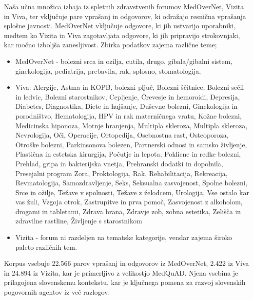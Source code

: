 \documentclass[fleqn,moreauthors,10pt]{ds_report}
\begin{document}
Naša učna množica izhaja iz spletnih zdravstvenih forumov MedOverNet, Vizita in Viva, ter vključuje pare vprašanj in odgovorov, ki odražajo resnična vprašanja splošne javnosti. MedOverNet vključuje odgovore, ki jih ustvarijo uporabniki, medtem ko Vizita in Viva zagotavljata odgovore, ki jih pripravijo strokovnjaki, kar močno izboljša zanesljivost. Zbirka podatkov zajema različne teme;
\begin{itemize}
    \item MedOverNet - bolezni srca in ozilja, cutila, drugo, gibala/gibalni sistem, ginekologija, pediatrija, prebavila, rak, splosno, stomatologija,
    \item Viva: Alergije, Astma in KOPB, bolezni pljuč, Bolezni ščitnice, Bolezni sečil in ledvic, Bolezni starostnikov, Cepljenje, Črevesje in hemoroidi, Depresija, Diabetes, Diagnostika, Diete in hujšanje, Duševne bolezni, Gi\-ne\-ko\-lo\-gi\-ja in porodništvo, Hematologija, HPV in rak materničnega vratu, Kožne bolezni, Medicinska hip\-o\-no\-za, Motnje hranjenja, Multipla skleroza, Multipla skleroza, Nevrologija, Oči, Operacije, Ortopedija, Osebnostna rast, Osteoporoza, Otroške bolezni, Parkinsonova bolezen, Partnerski odnosi in samsko življenje, Plastična in estetska kirurgija, Počutje in lepota, Poklicne in redke bolezni, Prehlad, gripa in bakterijska vnetja, Prehranski dodatki in dopolnila, Presejalni program Zora, Proktologija, Rak, Rehabilitacija, Re\-kr\-ea\-cija, Revmatologija, Samozdravljenje, Seks, Seksualna zasvojenost, Spolne bolezni, Srce in ožilje, Težave v spolnosti, Težave z želodcem, Urologija, Vse ostalo kar vas žuli, Vzgoja otrok, Zastrupitve in prva pomoč, Zasvojenost z alkoholom, drogami in tabletami, Zdrava hrana, Zdravje zob, zobna estetika, Zelišča in zdravilne rastline, Življenje s starostnikom
    \item Vizita - forum ni razdeljen na tematske kategorije, vendar zajema široko paleto različnih tem.
\end{itemize}
Korpus vsebuje 22.566 parov vprašanj in odgovorov iz Med\-Over\-Net, 2.422 iz Viva in 24.894 iz Vizita, kar je primerljivo z velikostjo MedQuAD. Njena vsebina je prilagojena slo\-ven\-ske\-mu kontekstu, kar je ključnega pomena za razvoj slovenskih pogovornih agentov iz več razlogov:
\end{document}

